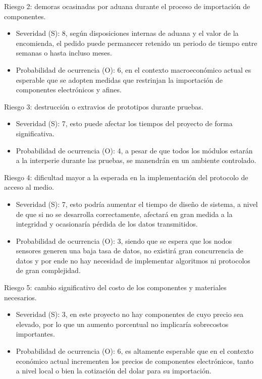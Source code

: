 \documentclass[
11pt, %
codirector, %
]{charter}
\begin{document}
Riesgo 2: demoras ocasinadas por aduana durante el proceso de importación de componentes.
\begin{itemize}
	\item Severidad (S): 8, según disposiciones internas de aduana y el valor de la encomienda, el pedido puede permanecer retenido un periodo de tiempo entre semanas o hasta incluso meses.
	\item Probabilidad de ocurrencia (O): 6, en el contexto macroeconómico actual es esperable que se adopten medidas que restrinjan la importación de componentes electrónicos y afines.
\end{itemize}

Riesgo 3: destrucción o extravios de prototipos durante pruebas.
\begin{itemize}
	\item Severidad (S): 7, esto puede afectar los tiempos del proyecto de forma significativa.
	\item Probabilidad de ocurrencia (O): 4, a pesar de que todos los módulos estarán a la interperie durante las pruebas, se manendrán en un ambiente controlado.
\end{itemize}

Riesgo 4: dificultad mayor a la esperada en la implementación del protocolo de acceso al medio.
\begin{itemize}
	\item Severidad (S): 7, esto podría aumentar el tiempo de diseño de sistema, a nivel de que si no se desarrolla correctamente, afectará en gran medida a la integridad y ocasionaría pérdida de los datos transmitidos.
	\item Probabilidad de ocurrencia (O): 3, siendo que se espera que los nodos sensores generen una baja tasa de datos, no existirá gran concurrencia de datos y por ende no hay necesidad de implementar algoritmos ni protocolos de gran complejidad.
\end{itemize}

Riesgo 5: cambio significativo del costo de los componentes y materiales necesarios.
\begin{itemize}
	\item Severidad (S): 3, en este proyecto no hay componentes de cuyo precio sea elevado, por lo que un aumento porcentual no implicaría sobrecostos importantes.
	\item Probabilidad de ocurrencia (O): 6, es altamente esperable que en el contexto económico actual incrementen los precios de componentes electrónicos, tanto a nivel local o bien la cotización del dolar para su importación. 
\end{itemize}
\end{document}
